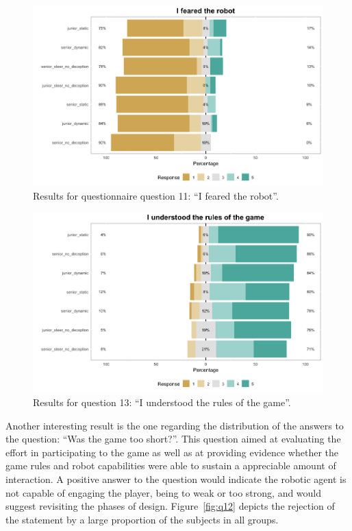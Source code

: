 \begin{figure}[h]
    \centering
    \includegraphics[draft=false, width=\linewidth]{images/06-deception/Q11}
    \caption{Results for questionnaire question 11: ``I feared the robot''.}
    \label{fig:q11}
\end{figure}

\begin{figure}[h]
    \centering
    \includegraphics[draft=false, width=\linewidth]{images/06-deception/Q13}
    \caption{Results for question 13: ``I understood the rules of the game''.}
    \label{fig:q13}
\end{figure}

Another interesting result is the one regarding the distribution of the answers to the question: ``Was the game too short?''. This question aimed at evaluating the effort in participating to the game as well as at providing evidence whether the game rules and robot capabilities were able to sustain a appreciable amount of interaction. A positive answer to the question would indicate the robotic agent is not capable of engaging the player, being to weak or too strong, and would suggest revisiting the phases of design. Figure~\ref{fig:q12} depicts the rejection of the statement by a large proportion of the subjects in all groups.

